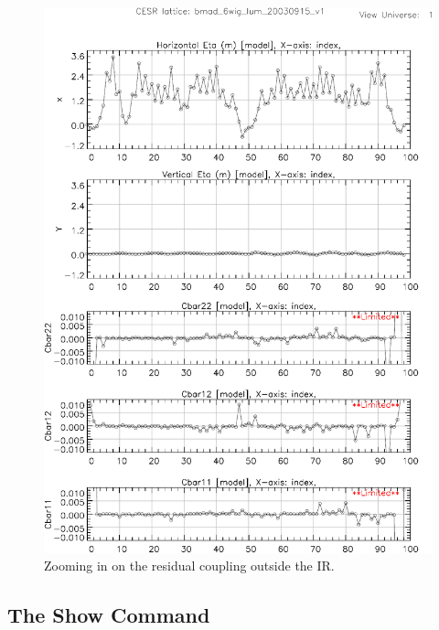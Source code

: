 \begin{figure}
  \centering
  \includegraphics[width=5in]{plot-coupling-no-IR.pdf}
  \caption{Zooming in on the residual coupling outside the IR.}
  \label{f:plot.coupling.no.IR}
\end{figure}

\subsection{The Show Command}

